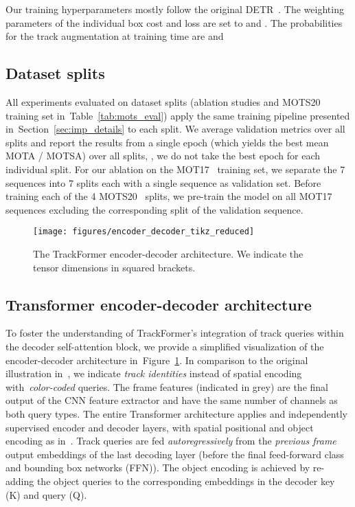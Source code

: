 \documentclass[10pt,twocolumn,letterpaper]{article}
\newcommand{\figref}[1]{Figure~\ref{#1}}
\newcommand{\secref}[1]{Section~\ref{#1}}
\newcommand{\tabref}[1]{Table~\ref{#1}}
\begin{document}
Our training hyperparameters mostly follow the original DETR~\cite{DETR}.
The weighting parameters of the individual box cost  and loss  are set to  and .
The probabilities for the track augmentation at training time are  and 

\subsection{Dataset splits}

All experiments evaluated on dataset splits (ablation studies and MOTS20 training set in~\tabref{tab:mots_eval}) apply the same training pipeline presented in~\secref{sec:imp_details} to each split.
We average validation metrics over all splits and report the results from a single epoch (which yields the best mean MOTA / MOTSA) over all splits, \ie, we do not take the best epoch for each individual split.
For our ablation on the MOT17~\cite{MOT16} training set, we separate the 7 sequences into 7 splits each with a single sequence as validation set.
Before training each of the 4 MOTS20~\cite{MOTS} splits, we pre-train the model on all MOT17 sequences excluding the corresponding split of the validation sequence.



\begin{figure}
    \begin{center}
        \texttt{[image: figures/encoder\_decoder\_tikz\_reduced]}
    \end{center}
    \caption{
        The TrackFormer encoder-decoder architecture. We indicate the tensor dimensions in squared brackets.}
    \label{fig:encoder_decoder}
\end{figure} 
\subsection{Transformer encoder-decoder architecture} \label{sec:impl_details_enc_dec}
To foster the understanding of TrackFormer's integration of track queries within the decoder self-attention block, we provide a simplified visualization of the encoder-decoder architecture in~\figref{fig:encoder_decoder}.
In comparison to the original illustration in~\cite{DETR}, we indicate \textit{track identities} instead of spatial encoding with~\textit{color-coded} queries.
The frame features (indicated in grey) are the final output of the CNN feature extractor and have the same number of channels as both query types.
The entire Transformer architecture applies  and  independently supervised encoder and decoder layers, with spatial positional and object encoding as in~\cite{DETR}.
Track queries are fed \textit{autoregressively} from the \textit{previous frame} output embeddings of the last decoding layer (before the final feed-forward class and bounding box networks (FFN)).
The object encoding is achieved by re-adding the object queries to the corresponding embeddings in the decoder key (K) and query (Q).
\end{document}
